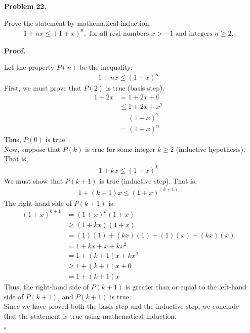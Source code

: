 \documentclass{article}
\newenvironment{problem}[1]{
    \begin{mdframed}[backgroundcolor=gray!20, skipabove=\baselineskip, skipbelow=\baselineskip, nobreak=true, innerleftmargin=10pt, innerrightmargin=10pt, innertopmargin=10pt, innerbottommargin=10pt]
    \textbf{Problem #1.}
}{
    \end{mdframed}
}
\newenvironment{proof}{
    \begin{mdframed}[nobreak=false, innerleftmargin=10pt, innerrightmargin=10pt, innertopmargin=10pt, innerbottommargin=10pt]
    \textbf{Proof.}
}{
    \hfill $\square$
    \end{mdframed}
}
\begin{document}
    \begin{problem}{22}
        Prove the statement by mathematical induction:
        \begin{align*}
            1 + nx \leq {(1 + x)}^n, \text{ for all real numbers } x > -1 \text{ and integers } n \geq 2.
        \end{align*}
    \end{problem}
    \begin{proof}
        Let the property $P(n)$ be the inequality:
        \begin{align*}
            1 + nx \leq {(1 + x)}^n
        \end{align*}
        First, we must prove that $P(2)$ is true (basis step).
        \begin{align*}
            1 + 2x &= 1 + 2x + 0\\
            &\leq 1 + 2x + x^2 \\
            &= {(1 + x)}^2 \\
            &= {(1 + x)}^n
        \end{align*}
        Thus, $P(0)$ is true. \\
        Now, suppose that $P(k)$ is true for some integer $k \geq 2$ (inductive hypothesis). That is,
        \begin{align*}
            1 + kx \leq {(1 + x)}^k
        \end{align*}
        We must show that $P(k+1)$ is true (inductive step). That is,
        \begin{align*}
            1 + {(k+1)}x \leq {(1 + x)}^{(k+1)}
        \end{align*}
        The right-hand side of $P(k+1)$ is:
        \begin{align*}
            (1+x)^{k+1}&=(1+x)^{k}(1+x) \\
            &\geq(1+k x)(1+x) \\
            &=(1)(1)+(k x)(1)+(1)(x)+(k x)(x) \\
            &=1+k x+x+k x^{2} \\
            &=1+(k+1) x+k x^{2} \\
            &\geq 1+(k+1) x+0 \\
            &=1+(k+1) x
        \end{align*}
        Thus, the right-hand side of $P(k+1)$ is greater than or equal to the left-hand side of $P(k+1)$, and $P(k+1)$ is true. \\
        Since we have proved both the basis step and the inductive step, we conclude that the statement is true using mathematical induction.
    \end{proof}
\end{document}
